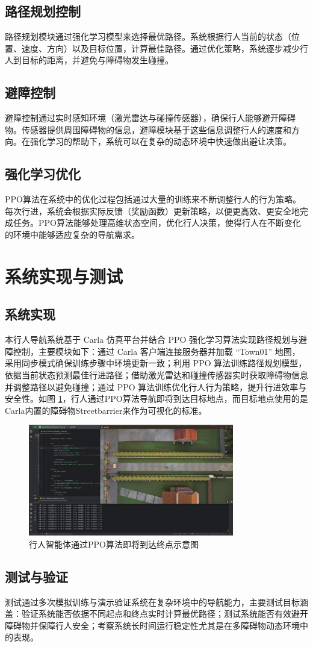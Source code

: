 	\subsection{路径规划控制}
	路径规划模块通过强化学习模型来选择最优路径。系统根据行人当前的状态（位置、速度、方向）以及目标位置，计算最佳路径。通过优化策略，系统逐步减少行人到目标的距离，并避免与障碍物发生碰撞。
	
	\subsection{避障控制}
	避障控制通过实时感知环境（激光雷达与碰撞传感器），确保行人能够避开障碍物。传感器提供周围障碍物的信息，避障模块基于这些信息调整行人的速度和方向。在强化学习的帮助下，系统可以在复杂的动态环境中快速做出避让决策。
	
	\subsection{强化学习优化}
	PPO算法在系统中的优化过程包括通过大量的训练来不断调整行人的行为策略。每次行进，系统会根据实际反馈（奖励函数）更新策略，以便更高效、更安全地完成任务。PPO算法能够处理高维状态空间，优化行人决策，使得行人在不断变化的环境中能够适应复杂的导航需求。
	
	\section{系统实现与测试}
	
	\subsection{系统实现}
	
	本行人导航系统基于 Carla 仿真平台并结合 PPO 强化学习算法实现路径规划与避障控制，主要模块如下：通过 Carla 客户端连接服务器并加载 “Town01” 地图，采用同步模式确保训练步骤中环境更新一致；利用 PPO 算法训练路径规划模型，依据当前状态预测最佳行进路径；借助激光雷达和碰撞传感器实时获取障碍物信息并调整路径以避免碰撞；通过 PPO 算法训练优化行人行为策略，提升行进效率与安全性。如图 \ref{fig:ped_nav}，行人通过PPO算法导航即将到达目标地点，而目标地点使用的是Carla内置的障碍物Streetbarrier来作为可视化的标准。
	
	\begin{figure}[H]
	    \centering
	    \includegraphics[width=0.8\textwidth]{images/pedestrain_navgation.pdf}
	    \caption{行人智能体通过PPO算法即将到达终点示意图}
	    \label{fig:ped_nav}
	\end{figure}
	
	\subsection{测试与验证}
	
	测试通过多次模拟训练与演示验证系统在复杂环境中的导航能力，主要测试目标涵盖：验证系统能否依据不同起点和终点实时计算最优路径；测试系统能否有效避开障碍物并保障行人安全；考察系统长时间运行稳定性尤其是在多障碍物动态环境中的表现。
